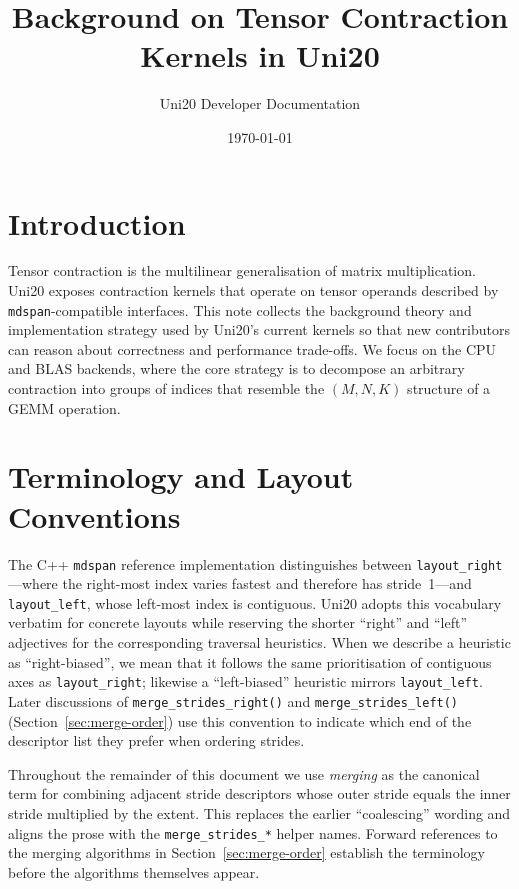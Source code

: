 \documentclass[11pt]{article}
\title{Background on Tensor Contraction Kernels in Uni20}
\author{Uni20 Developer Documentation}
\date{\today}
\begin{document}
\maketitle

\section{Introduction}
Tensor contraction is the multilinear generalisation of matrix multiplication.  Uni20 exposes
contraction kernels that operate on tensor operands described by \texttt{mdspan}-compatible
interfaces.  This note collects the background theory and implementation strategy used by Uni20's
current kernels so that new contributors can reason about correctness and performance trade-offs.
We focus on the CPU and BLAS backends, where the core strategy is to decompose an arbitrary
contraction into groups of indices that resemble the \((M,N,K)\) structure of a GEMM operation.

\section{Terminology and Layout Conventions}
The C++ \texttt{mdspan} reference implementation distinguishes between
\texttt{layout\_right}---where the right-most index varies fastest and therefore has stride~1---and
\texttt{layout\_left}, whose left-most index is contiguous.  Uni20 adopts this vocabulary verbatim
for concrete layouts while reserving the shorter ``right'' and ``left'' adjectives for the
corresponding traversal heuristics.  When we describe a heuristic as ``right-biased'', we mean that
it follows the same prioritisation of contiguous axes as \texttt{layout\_right}; likewise a
``left-biased'' heuristic mirrors \texttt{layout\_left}.  Later discussions of
\texttt{merge\_strides\_right()} and \texttt{merge\_strides\_left()} (Section~\ref{sec:merge-order})
use this convention to indicate which end of the descriptor list they prefer when ordering strides.

Throughout the remainder of this document we use \emph{merging} as the canonical term for combining
adjacent stride descriptors whose outer stride equals the inner stride multiplied by the extent.
This replaces the earlier ``coalescing'' wording and aligns the prose with the
\texttt{merge\_strides\_*} helper names.  Forward references to the merging algorithms in
Section~\ref{sec:merge-order} establish the terminology before the algorithms themselves appear.
\end{document}

